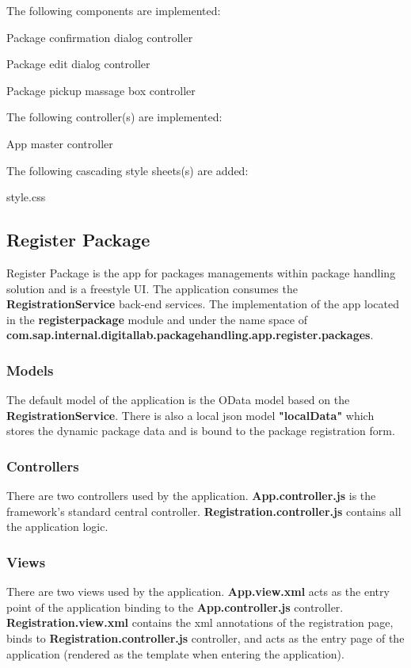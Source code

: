 \bigskip
The following components are implemented:
\begin{compactenum}
    \item Package confirmation dialog controller
    \item Package edit dialog controller
    \item Package pickup massage box controller
\end{compactenum}

\bigskip
The following controller(s) are implemented:
\begin{compactenum}
    \item App master controller
\end{compactenum}

\bigskip
The following cascading style sheets(s) are added:
\begin{compactenum}
    \item style.css
\end{compactenum}


\subsection{Register Package}

Register Package is the app for packages managements within package handling solution and is a freestyle UI.
The application consumes the \textbf{RegistrationService} back-end services.
The implementation of the app
located in the \textbf{registerpackage} module and under the name space of
\textbf{com.sap.internal.digitallab.packagehandling.app.register.packages}.

\subsubsection{Models}
The default model of the application is the OData model based on the \textbf{RegistrationService}. There is also a local json model \textbf{"localData"} which stores the dynamic package data and is bound to the package registration form.

\subsubsection{Controllers}
There are two controllers used by the application. \textbf{App.controller.js} is the framework's standard central controller. \textbf{Registration.controller.js} contains all the application logic.

\subsubsection{Views}
There are two views used by the application. \textbf{App.view.xml} acts as the entry point of the application binding to the \textbf{App.controller.js} controller. \textbf{Registration.view.xml} contains the xml annotations of the registration page, binds to \textbf{Registration.controller.js} controller, and acts as the entry page of the application (rendered as the template when entering the application).

